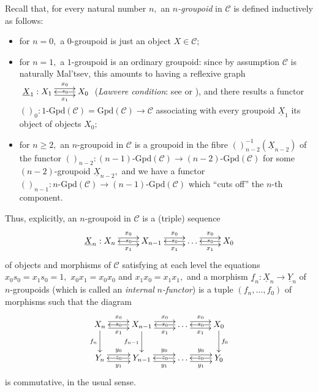 \documentclass[11pt]{amsart}
\theoremstyle{plain}
\theoremstyle{definition}
\theoremstyle{remark}
\begin{document}
Recall that, for every natural number $n,$ an $n$\emph{-groupoid} in $\mathcal{C}$ is defined inductively as follows:
\begin{itemize}
\item for $n=0,$ a $0$-groupoid is just an object $X\in\mathcal{C};$
\item for $n=1,$ a $1$-groupoid is an ordinary groupoid: since by assumption $\mathcal{C}$ is naturally Mal'tsev, this amounts to having a reflexive graph $\xymatrix{{\underline{X}_1:X_1} \ar@<.9ex>[r]^-{x_0} \ar@<-.9ex>[r]_-{x_1} &{X_0} \ar[l]|(.39){s_0}}$ (\emph{Lawvere condition}: see \cite{johnstone} or \cite{bourn96}), and there results a functor $()_0\colon1\text{-}\mathrm{Gpd}(\mathcal{C})=\mathrm{Gpd}(\mathcal{C})\rightarrow\mathcal{C}$ associating with every groupoid $\underline{X}_1$ its object of objects $X_0;$
\item for $n\geq 2,$ an $n$-groupoid in $\mathcal{C}$ is a groupoid in the fibre $()^{-1}_{n-2}(\underline{X}_{n-2})$ of the functor $()_{n-2}\colon(n-1)\text{-}\mathrm{Gpd}(\mathcal{C})\rightarrow(n-2)\text{-}\mathrm{Gpd}(\mathcal{C})$ for some $(n-2)$-groupoid $\underline{X}_{n-2},$ and we have a functor $()_{n-1}\colon n\text{-}\mathrm{Gpd}(\mathcal{C})\rightarrow(n-1)\text{-}\mathrm{Gpd}(\mathcal{C})$ which ``cuts off'' the $n$-th component.
\end{itemize}
Thus, explicitly, an $n$-groupoid in $\mathcal{C}$ is a (triple) sequence
\begin{equation*}
\xymatrix{
{\underline{X}_n:X_n} \ar@<.9ex>[r]^-{x_0} \ar@<-.9ex>[r]_-{x_1} &{X_{n-1}} \ar[l]|(.44){s_0} \ar@<.9ex>[r]^-{x_0} \ar@<-.9ex>[r]_-{x_1} &{\dots} \ar[l]|(.43){s_0} \ar@<.9ex>[r]^-{x_0} \ar@<-.9ex>[r]_-{x_1} &{X_0} \ar[l]|{s_0}
}
\end{equation*}
of objects and morphisms of $\mathcal{C}$ satisfying at each level the equations $x_0s_0=x_1s_0=1,$ $x_0x_1=x_0x_0$ and $x_1x_0=x_1x_1,$ and a morphism $\underline{f}_n\colon\underline{X}_n\rightarrow\underline{Y}_n$ of $n$-groupoids (which is called an \emph{internal} $n$\emph{-functor}) is a tuple $(f_n,\dots,f_0)$ of morphisms such that the diagram
\begin{equation*}
\xymatrix{
{X_n} \ar[d]_-{f_n} \ar@<.9ex>[r]^-{x_0} \ar@<-.9ex>[r]_-{x_1} &{X_{n-1}} \ar[d]_-{f_{n-1}} \ar[l]|(.55){s_0} \ar@<.9ex>[r]^-{x_0} \ar@<-.9ex>[r]_-{x_1} &{\dots} \ar[l]|(.43){s_0} \ar@<.9ex>[r]^-{x_0} \ar@<-.9ex>[r]_-{x_1} &{X_0} \ar[d]^-{f_0} \ar[l]|{s_0} \\
{Y_n} \ar@<.9ex>[r]^-{y_0} \ar@<-.9ex>[r]_-{y_1} &{Y_{n-1}} \ar[l]|(.55){z_0} \ar@<.9ex>[r]^-{y_0} \ar@<-.9ex>[r]_-{y_1} &{\dots} \ar[l]|(.43){z_0} \ar@<.9ex>[r]^-{y_0} \ar@<-.9ex>[r]_-{y_1} &{Y_0} \ar[l]|{z_0}
}
\end{equation*}
is commutative, in the usual sense.
\end{document}
